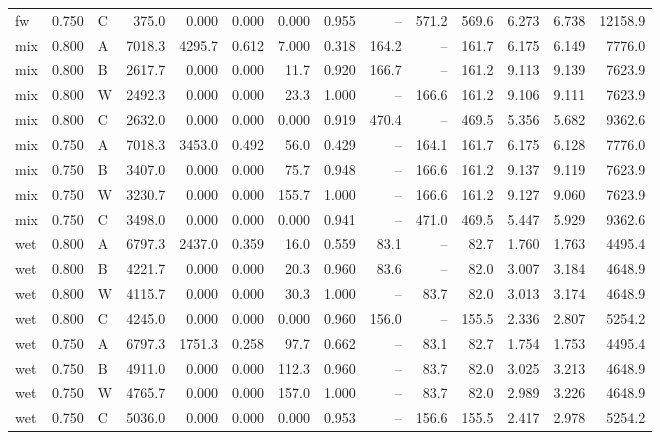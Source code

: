 \begin{tabular}{lllrrrrrrrrrrr}
fw & 0.750 & C & 375.0 & 0.000 & 0.000 & 0.000 & 0.955 & -- & 571.2 & 569.6 & 6.273 & 6.738 & 12158.9 \\
mix & 0.800 & A & 7018.3 & 4295.7 & 0.612 & 7.000 & 0.318 & 164.2 & -- & 161.7 & 6.175 & 6.149 & 7776.0 \\
mix & 0.800 & B & 2617.7 & 0.000 & 0.000 & 11.7 & 0.920 & 166.7 & -- & 161.2 & 9.113 & 9.139 & 7623.9 \\
mix & 0.800 & W & 2492.3 & 0.000 & 0.000 & 23.3 & 1.000 & -- & 166.6 & 161.2 & 9.106 & 9.111 & 7623.9 \\
mix & 0.800 & C & 2632.0 & 0.000 & 0.000 & 0.000 & 0.919 & 470.4 & -- & 469.5 & 5.356 & 5.682 & 9362.6 \\
mix & 0.750 & A & 7018.3 & 3453.0 & 0.492 & 56.0 & 0.429 & -- & 164.1 & 161.7 & 6.175 & 6.128 & 7776.0 \\
mix & 0.750 & B & 3407.0 & 0.000 & 0.000 & 75.7 & 0.948 & -- & 166.6 & 161.2 & 9.137 & 9.119 & 7623.9 \\
mix & 0.750 & W & 3230.7 & 0.000 & 0.000 & 155.7 & 1.000 & -- & 166.6 & 161.2 & 9.127 & 9.060 & 7623.9 \\
mix & 0.750 & C & 3498.0 & 0.000 & 0.000 & 0.000 & 0.941 & -- & 471.0 & 469.5 & 5.447 & 5.929 & 9362.6 \\
wet & 0.800 & A & 6797.3 & 2437.0 & 0.359 & 16.0 & 0.559 & 83.1 & -- & 82.7 & 1.760 & 1.763 & 4495.4 \\
wet & 0.800 & B & 4221.7 & 0.000 & 0.000 & 20.3 & 0.960 & 83.6 & -- & 82.0 & 3.007 & 3.184 & 4648.9 \\
wet & 0.800 & W & 4115.7 & 0.000 & 0.000 & 30.3 & 1.000 & -- & 83.7 & 82.0 & 3.013 & 3.174 & 4648.9 \\
wet & 0.800 & C & 4245.0 & 0.000 & 0.000 & 0.000 & 0.960 & 156.0 & -- & 155.5 & 2.336 & 2.807 & 5254.2 \\
wet & 0.750 & A & 6797.3 & 1751.3 & 0.258 & 97.7 & 0.662 & -- & 83.1 & 82.7 & 1.754 & 1.753 & 4495.4 \\
wet & 0.750 & B & 4911.0 & 0.000 & 0.000 & 112.3 & 0.960 & -- & 83.7 & 82.0 & 3.025 & 3.213 & 4648.9 \\
wet & 0.750 & W & 4765.7 & 0.000 & 0.000 & 157.0 & 1.000 & -- & 83.7 & 82.0 & 2.989 & 3.226 & 4648.9 \\
wet & 0.750 & C & 5036.0 & 0.000 & 0.000 & 0.000 & 0.953 & -- & 156.6 & 155.5 & 2.417 & 2.978 & 5254.2 \\
\bottomrule
\end{tabular}
